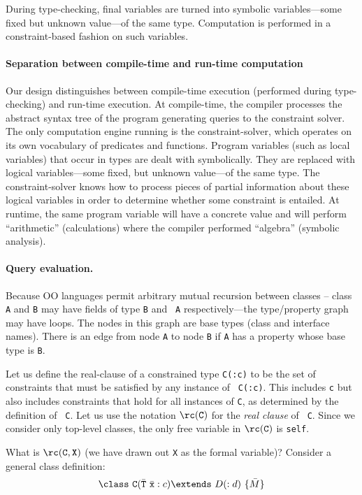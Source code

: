 During type-checking, final variables are turned into symbolic
variables---some fixed but unknown value---of the same type.
Computation is performed in a constraint-based fashion on such
variables.

\paragraph{Separation between compile-time and run-time computation}
Our design distinguishes between compile-time execution (performed
during type-checking) and run-time execution. At compile-time, the
compiler processes the abstract syntax tree of the program generating
queries to the constraint solver. The only computation engine running
is the constraint-solver, which operates on its own vocabulary of
predicates and functions. Program variables (such as local variables)
that occur in types are dealt with symbolically. They are replaced
with logical variables---some fixed, but unknown value---of the same
type. The constraint-solver knows how to process pieces of partial
information about these logical variables in order to determine
whether some constraint is entailed. At runtime, the same program
variable will have a concrete value and will perform ``arithmetic''
(calculations) where the compiler performed ``algebra'' (symbolic
analysis).

\paragraph{Query evaluation.}

Because OO languages permit arbitrary mutual recursion between classes
-- class {\tt A} and {\tt B} may have fields of type {\tt B} and {\tt
A} respectively---the type/property graph may have loops. The nodes
in this graph are base types (class and interface names). There is an
edge from node {\tt A} to node {\tt B} if {\tt A} has a property whose
base type is {\tt B}.

Let us define the real-clause of a constrained type {\tt C(:c)} to be
the set of constraints that must be satisfied by any instance of {\tt
C(:c)}. This includes {\tt c} but also includes constraints that hold
for all instances of {\tt C}, as determined by the definition of {\tt
C}. Let us use the notation $\rc({\tt C})$ for the {\em real clause} of {\tt
C}. Since we consider only top-level classes, the only free variable in 
$\rc({\tt C})$ is {\tt self}.

What is $\rc({\tt C}, {\tt X})$ (we have drawn out {\tt X} as the
formal variable)? Consider a general class definition:
$$\class\ {\tt C}(\bar{\tt T}\ \bar{\tt x} : c)\extends\ D(:d)\ \{\bar{M}\}$$


